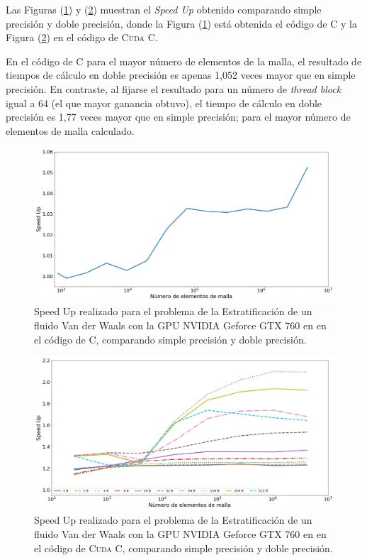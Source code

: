 \newpage

Las Figuras (\ref{fig:c_760_VdW_c_10}) y (\ref{fig:c_760_VdW_cuda_10}) muestran el \textit{Speed Up} obtenido comparando simple precisión y doble precisión, donde la Figura (\ref{fig:c_760_VdW_c_10}) está obtenida el código de \textsc{C} y la Figura (\ref{fig:c_760_VdW_cuda_10}) en el código de \textsc{Cuda C}. 

En el código de \textsc{C} para el mayor número de elementos de la malla, el resultado de tiempos de cálculo en doble precisión es apenas 1,052 veces mayor que en  simple precisión. En contraste, al fijarse el resultado para un número de \textit{thread block} igual a 64 (el que mayor ganancia obtuvo), el tiempo de cálculo en doble precisión es 1,77 veces mayor que en simple precisión; para el mayor número de elementos de malla calculado.

\begin{figure}[htbp]
	\centering
	\includegraphics[width=\textwidth]{figs/cap4/c_760_VdW_c_10}
	\caption{Speed Up realizado para el problema de la Estratificación de un fluido Van der Waals con la GPU NVIDIA Geforce GTX 760 en en el código de \textsc{C}, comparando simple precisión y doble precisión.} 
	\label{fig:c_760_VdW_c_10}	
\end{figure}

\begin{figure}[htbp]
	\centering
	\includegraphics[width=\textwidth]{figs/cap4/c_760_MxC_cuda_10}
	\caption{Speed Up realizado para el problema de la Estratificación de un fluido Van der Waals con la GPU NVIDIA Geforce GTX 760 en en el código de \textsc{Cuda C}, comparando simple precisión y doble precisión.} 
	\label{fig:c_760_VdW_cuda_10}	
\end{figure}

